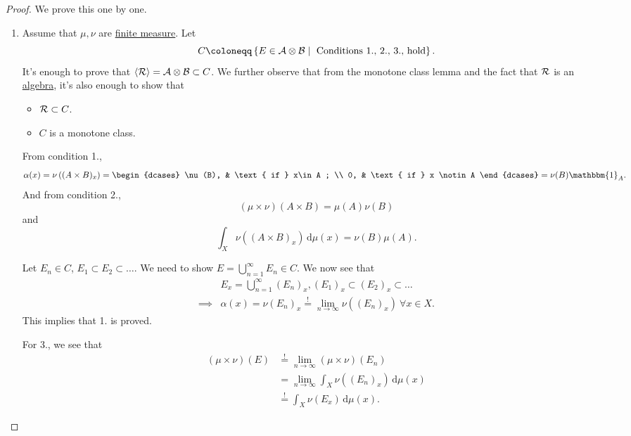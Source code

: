 \begin{proof}
	We prove this one by one.
	\begin{enumerate}
		\item Assume that \(\mu , \nu \) are \hyperref[def:finite-measure]{finite measure}. Let
		      \[
			      C \coloneqq \left\{E\in \mathcal{\MakeUppercase{a}} \otimes \mathcal{\MakeUppercase{b}} \mid \text{ Conditions 1., 2., 3., hold} \right\}.
		      \]
		      It's enough to prove that \(\left< \mathcal{\MakeUppercase{r}}  \right> = \mathcal{\MakeUppercase{a}} \otimes \mathcal{\MakeUppercase{b}} \subset C\).
		      We further observe that from the monotone class lemma and the fact that \(\mathcal{\MakeUppercase{r}} \) is an \hyperref[def:algebra]{algebra},
		      it's also enough to show that
		      \begin{itemize}
			      \item \(\mathcal{\MakeUppercase{r}} \subset C\).
			      \item \(C\) is a monotone class.
		      \end{itemize}
		      \par From condition 1.,
		      \[
			      \alpha (x) = \nu \left((A\times B)_x\right) = \begin{dcases}
				      \nu (B), & \text{ if } x\in A ;   \\
				      0,       & \text{ if } x \notin A
			      \end{dcases} = \nu (B)\mathbbm{1}_{A}.
		      \]
		      And from condition 2.,
		      \[
			      (\mu \times \nu )(A\times B) = \mu (A)\nu (B)
		      \]
		      and
		      \[
			      \int _X \nu ((A\times B)_x)\,\mathrm{d} \mu (x) = \nu (B)\mu (A).
		      \]

		      \par Let \(E_{n} \in C\), \(E_1\subset E_{2}\subset \ldots\). We need to show \(E = \bigcup\limits_{n=1}^{\infty} E_{n} \in C\).
		      We now see that
		      \[
			      \begin{split}
				      &E_{x}  = \bigcup\limits_{n=1}^{\infty} (E_{n} )_x, (E_1)_x\subset (E_2)_x\subset \ldots\\
				      \implies &\alpha (x) = \nu (E_n)_x \overset{\hyperref[thm:measure-space-continuity-from-below]{!}}{=} \lim\limits_{n \to \infty} \nu ((E_n)_x)\ \forall x\in X.
			      \end{split}
		      \]
		      This implies that 1. is proved.

		      For 3., we see that
		      \[
			      \begin{split}
				      (\mu \times \nu )(E)&\overset{\hyperref[thm:measure-space-continuity-from-below]{!}}{=}\lim\limits_{n \to \infty} (\mu \times \nu )(E_{n} )\\
				      &= \lim\limits_{n \to \infty} \int _X \nu ((E_{n})_x) \,\mathrm{d} \mu (x)\\
				      &\overset{\hyperref[thm:MCT]{!}}{=} \int _X \nu (E_{x} )\,\mathrm{d} \mu (x).
			      \end{split}
		      \]




\end{enumerate}
\end{proof}
